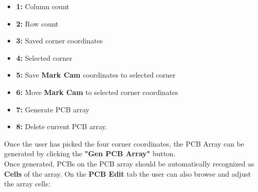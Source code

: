 \documentclass[a4paper,10pt]{report}
\begin{document}
\begin{itemize}
 \item \textbf{1: } Column count
 \item \textbf{2: } Row count
 \item \textbf{3: } Saved corner coordinates
 \item \textbf{4: } Selected corner
 \item \textbf{5: } Save \textbf{Mark Cam} coordinates to selected corner
 \item \textbf{6: } Move \textbf{Mark Cam} to selected corner coordinates
 \item \textbf{7: } Generate PCB array
 \item \textbf{8: } Delete current PCB array.
\end{itemize}

Once the user has picked the four corner coordinates, the PCB Array can be generated by clicking the \textbf{"Gen PCB Array"} button.\\
\newpage
Once generated, PCBs on the PCB array should be automatically recognized as \textbf{Cells} of the array. On the \textbf{PCB Edit} tab the user can also  browse and adjust the array cells: \\
\end{document}
